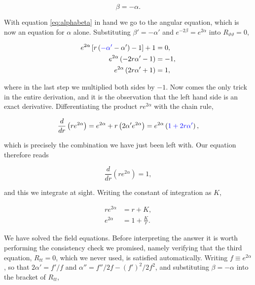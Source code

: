         \begin{equation}\label{eq:alphabeta}
            \beta = -\alpha.
        \end{equation}

        With equation \ref{eq:alphabeta} in hand we go to the angular equation, which is now an equation for $\alpha$ alone. Substituting $\beta'=-\alpha'$ and $e^{-2\beta}=e^{2\alpha}$ into $R_{\vartheta\vartheta}=0$,

        \begin{align*}
            e^{2\alpha}\left[r\left({\color{blue}-\alpha'}-\alpha'\right)-1\right] + 1 &= 0,\\
            e^{2\alpha}\left(-2r\alpha' - 1\right) &= -1,\\
            e^{2\alpha}\left(2r\alpha' + 1\right) &= 1,
        \end{align*}

        where in the last step we multiplied both sides by $-1$. Now comes the only trick in the entire derivation, and it is the observation that the left hand side is an exact derivative. Differentiating the product $re^{2\alpha}$ with the chain rule,

        \begin{equation}\label{eq:ExactDerivative}
            \frac{d}{dr}\left(re^{2\alpha}\right) = e^{2\alpha} + r\left(2\alpha'e^{2\alpha}\right) = e^{2\alpha}\left({\color{blue}1 + 2r\alpha'}\right),
        \end{equation}

        which is precisely the combination we have just been left with. Our equation therefore reads

        \begin{equation}
            \frac{d}{dr}\left(re^{2\alpha}\right) = 1,
        \end{equation}

        and this we integrate at sight. Writing the constant of integration as $K$,

        \begin{align*}
            re^{2\alpha} &= r + K,\\
            e^{2\alpha} &= 1 + \frac{K}{r}.
        \end{align*}

        We have solved the field equations. Before interpreting the answer it is worth performing the consistency check we promised, namely verifying that the third equation, $R_{tt}=0$, which we never used, is satisfied automatically. Writing $f \equiv e^{2\alpha}$, so that $2\alpha' = f'/f$ and $\alpha'' = f''/2f - (f')^2/2f^2$, and substituting $\beta=-\alpha$ into the bracket of $R_{tt}$,

